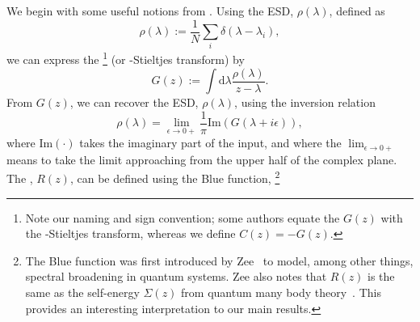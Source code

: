 We begin with some useful notions from \RandomMatrixTheory.
%
Using the ESD, $\rho(\lambda)$, defined as
\begin{equation}
\label{eqn:rgo}
\rho(\lambda):=\frac{1}{N}\sum_{i}\delta(\lambda-\lambda_{i})  ,
\end{equation}
%
we can express the \emph{\GreensFunction}%
\footnote{Note our naming and sign convention; some authors equate the \GreensFunction $G(z)$ with
the \Cauchy-Stieltjes transform, whereas we define $C(z)=-G(z)$. 
}
(or \emph{\Cauchy}-Stieltjes transform) by%
\begin{equation}
\label{eqn:Gz}
G(z):=\int \mathrm{d}\lambda \frac{\rho(\lambda)}{z-\lambda} .
\end{equation}
%
From $G(z)$, we can recover the ESD, $\rho(\lambda)$, using the inversion relation
\begin{equation}
\label{eqn:GzInverse}
\rho(\lambda)=\lim_{\epsilon\rightarrow 0+}\frac{1}{\pi}\mathrm{Im}(G(\lambda+i\epsilon))  ,
\end{equation}
where 
$\mathrm{Im}(\cdot)$
takes the imaginary part of the input, and where the $\lim_{\epsilon\rightarrow 0+}$ means to take the limit approaching from the upper half of the complex plane.
%
The \RTransform, $R(z)$, can be defined using the Blue function,%
\footnote{The Blue function was first introduced by Zee~\cite{Zee1996} to model, among other things, spectral broadening in quantum systems.
Zee also notes that $R(z)$ is the same as the self-energy $\Sigma(z)$ from quantum many body theory~\cite{Zee1996}.
This provides an interesting interpretation to our main results. }
